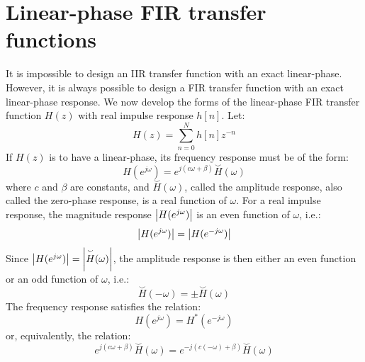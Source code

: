 \documentclass[../../main/main.tex]{subfiles}
\begin{document}

\section{Linear-phase FIR transfer functions}
It is impossible to design an IIR transfer function with an exact linear-phase. However, it is always possible to design a FIR transfer function with an exact linear-phase response. We now develop the forms of the linear-phase FIR transfer function \( H(z) \) with real impulse response \( h[n] \). Let:
\begin{equation}
    H(z)
    =
    \sum_{n=0}^{N} h[n] z^{-n}
    \label{eq:L20_S03_1}
\end{equation}
If \( H(z) \) is to have a linear-phase, its frequency response must be of the form:
\begin{equation}
    H(e^{j\omega})
    =
    e^{j(c\omega + \beta)} \overset{\smallsmile}{H}(\omega)
    \label{eq:L20_S03_2}
\end{equation}
where \( c \) and \( \beta \) are constants, and \( \overset{\smallsmile}{H}(\omega) \), called the amplitude response, also called the zero-phase response, is a real function of \( \omega \). For a real impulse response, the magnitude response \( \abs{H(e^{j\omega})} \) is an even function of \( \omega \), i.e.:
\begin{equation}
    \abs{H(e^{j\omega})}
    =
    \abs{H(e^{-j\omega})}
    \label{eq:L20_S04_1}
\end{equation}
Since \( \abs{H(e^{j\omega})} = \abs{\overset{\smallsmile}{H}(\omega)} \), the amplitude response is then either an even function or an odd function of \( \omega \), i.e.:
\begin{equation}
    \overset{\smallsmile}{H}(-\omega)
    =
    \pm \overset{\smallsmile}{H}(\omega)
    \label{eq:L20_S04_2}
\end{equation}
The frequency response satisfies the relation:
\begin{equation}
    H(e^{j\omega})
    =
    H^{*}(e^{-j\omega})
    \label{eq:L20_S05_1}
\end{equation}
or, equivalently, the relation:
\begin{equation}
    e^{j(c\omega + \beta)} \overset{\smallsmile}{H}(\omega)
    =
    e^{-j(c(-\omega) + \beta)} \overset{\smallsmile}{H}(\omega)
    \label{eq:L20_S05_2}
\end{equation}
\end{document}
